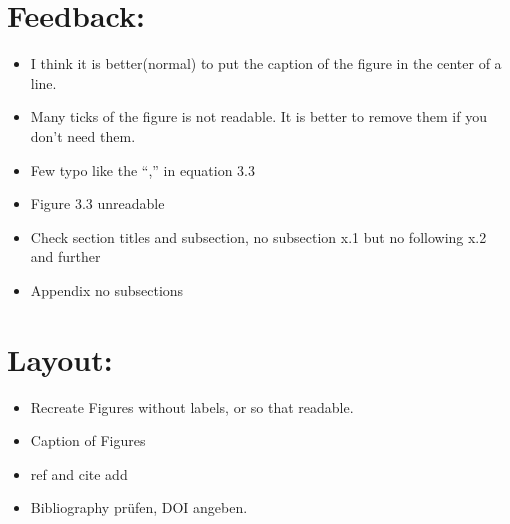 \section{Feedback:}
\begin{itemize}
    \item I think it is better(normal) to put the caption of the figure in the center of a line.
    \item Many ticks of the figure is not readable. It is better to remove them if you don’t need them.
    \item Few typo like the “,” in equation 3.3
    \item Figure 3.3 unreadable
    \item Check section titles and subsection, no subsection x.1 but no following x.2 and further
    \item Appendix no subsections
\end{itemize}

\section{Layout:}
\begin{itemize}
    \item Recreate Figures without labels, or so that readable.
    \item Caption of Figures
    \item ref and cite add ~
    \item Bibliography prüfen, DOI angeben.
\end{itemize}


\clearpage

